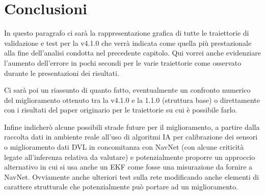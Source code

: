
\chapter{Conclusioni}



In questo paragrafo ci sarà la rappresentazione grafica di tutte le traiettorie di validazione e test per la v4.1.0 che verrà indicata come quella più prestazionale alla fine dell'analisi condotta nel precedente capitolo. Qui vorrei anche evidenziare l'aumento dell'errore in pochi secondi per le varie traiettorie come osservato durante le presentazioni dei risultati.

Ci sarà poi un riassunto di quanto fatto, eventualmente un confronto numerico del miglioramento ottenuto tra la v4.1.0 e la 1.1.0 (struttura base) o direttamente con i risultati del paper originario per le traiettorie su cui è possibile farlo. 

Infine indicherò alcune possibili strade future per il miglioramento, a partire dalla raccolta dati in ambiente reale all'uso di algoritmi IA per calibrazione dei sensori o miglioramento dati DVL in concomitanza con NavNet (con alcune criticità legate all'inferenza relativa da valutare) e potenzialmente proporre un approccio alternativo in cui si usa anche un EKF come fosse una misurazione da fornire a NavNet. Ovviamente anche ulteriori test sulla rete modificando anche elementi di carattere strutturale che potenzialmente può portare ad un miglioramento. 
